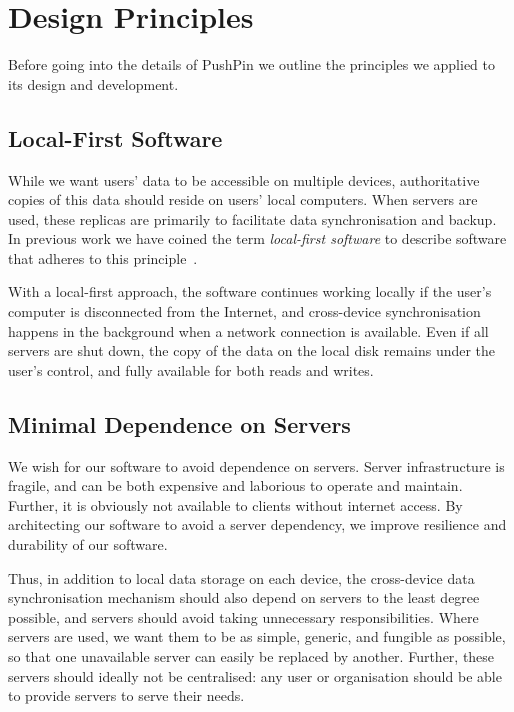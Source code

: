 \documentclass[sigplan,10pt]{acmart}
\begin{document}
\section{Design Principles}\label{sec:principles}

Before going into the details of PushPin we outline the principles we applied to its design and development.

\subsection{Local-First Software}

While we want users' data to be accessible on multiple devices, authoritative copies of this data should reside on users' local computers.
When servers are used, these replicas are primarily to facilitate data synchronisation and backup.
In previous work we have coined the term \emph{local-first software} to describe software that adheres to this principle~\cite{LocalFirst}.

With a local-first approach, the software continues working locally if the user's computer is disconnected from the Internet, and cross-device synchronisation happens in the background when a network connection is available.
Even if all servers are shut down, the copy of the data on the local disk remains under the user's control, and fully available for both reads and writes.

\subsection{Minimal Dependence on Servers}

We wish for our software to avoid dependence on servers. Server infrastructure is fragile, and can be both expensive and laborious to operate and maintain. Further, it is obviously not available to clients without internet access. By architecting our software to avoid a server dependency, we improve resilience and durability of our software.

Thus, in addition to local data storage on each device, the cross-device data synchronisation mechanism should also depend on servers to the least degree possible, and servers should avoid taking unnecessary responsibilities. Where servers are used, we want them to be as simple, generic, and fungible as possible, so that one unavailable server can easily be replaced by another. Further, these servers should ideally not be centralised: any user or organisation should be able to provide servers to serve their needs.
\end{document}
